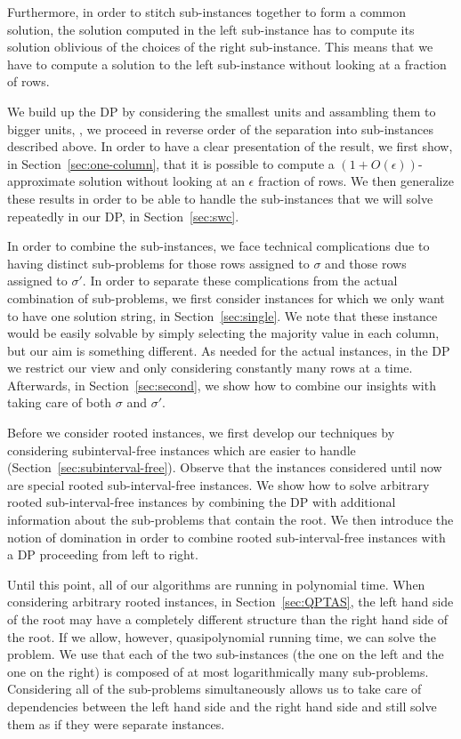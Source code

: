 Furthermore, in order to stitch sub-instances together to form a common solution, the solution computed in the left sub-instance has to compute its solution oblivious of the choices of the right sub-instance.
This means that we have to compute a solution to the left sub-instance without looking at a fraction of rows.

We build up the DP by considering the smallest units and assambling them to bigger units, \ie, we proceed in reverse order of the separation into sub-instances described above.
In order to have a clear presentation of the result, we first show, in Section~\ref{sec:one-column}, that it is possible to compute a $(1+O(\epsilon))$-approximate \BMEC solution without looking at an $\epsilon$ fraction of rows.
We then generalize these results in order to be able to handle the sub-instances that we will solve repeatedly in our DP, in Section~\ref{sec:swc}.

In order to combine the sub-instances, we face technical complications due to having distinct sub-problems for those rows assigned to $\sigma$ and those rows assigned to $\sigma'$.
In order to separate these complications from the actual combination of sub-problems, we first consider instances for which we only want to have one solution string, in Section~\ref{sec:single}.
We note that these instance would be easily solvable by simply selecting the majority value in each column, but our aim is something different.
As needed for the actual instances, in the DP we restrict our view and only considering constantly many rows at a time.
Afterwards, in Section~\ref{sec:second}, we show how to combine our insights with taking care of both $\sigma$ and $\sigma'$.

Before we consider rooted instances, we first develop our techniques by considering subinterval-free instances which are easier to handle (Section~\ref{sec:subinterval-free}).
Observe that the instances considered until now are special rooted sub-interval-free instances.
We show how to solve arbitrary rooted sub-interval-free instances by combining the DP with additional information about the sub-problems that contain the root.
We then introduce the notion of domination in order to combine rooted sub-interval-free instances with a DP proceeding from left to right.

Until this point, all of our algorithms are running in polynomial time.
When considering arbitrary rooted instances, in Section~\ref{sec:QPTAS}, the left hand side of the root may have a completely different structure than the right hand side of the root.
If we allow, however, quasipolynomial running time, we can solve the problem. 
We use that each of the two sub-instances (the one on the left and the one on the right) is composed of at most logarithmically many sub-problems.
Considering all of the sub-problems simultaneously allows us to take care of dependencies between the left hand side and the right hand side and still solve them as if they were separate instances.

